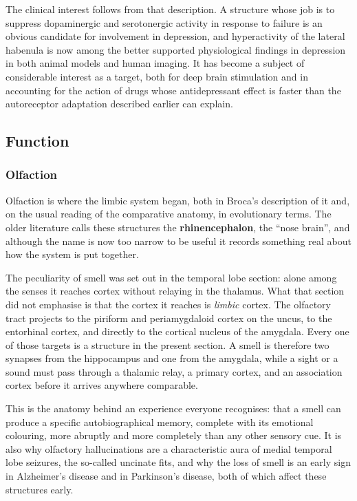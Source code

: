 \documentclass[11pt]{article}
\begin{document}
The clinical interest follows from that description. A structure whose job is to suppress dopaminergic and serotonergic activity in response to failure is an obvious candidate for involvement in depression, and hyperactivity of the lateral habenula is now among the better supported physiological findings in depression in both animal models and human imaging. It has become a subject of considerable interest as a target, both for deep brain stimulation and in accounting for the action of drugs whose antidepressant effect is faster than the autoreceptor adaptation described earlier can explain.

\subsection{Function}

\subsubsection{Olfaction}

Olfaction is where the limbic system began, both in Broca's description of it and, on the usual reading of the comparative anatomy, in evolutionary terms. The older literature calls these structures the \textbf{rhinencephalon}, the ``nose brain'', and although the name is now too narrow to be useful it records something real about how the system is put together.

The peculiarity of smell was set out in the temporal lobe section: alone among the senses it reaches cortex without relaying in the thalamus. What that section did not emphasise is that the cortex it reaches is \textit{limbic} cortex. The olfactory tract projects to the piriform and periamygdaloid cortex on the uncus, to the entorhinal cortex, and directly to the cortical nucleus of the amygdala. Every one of those targets is a structure in the present section. A smell is therefore two synapses from the hippocampus and one from the amygdala, while a sight or a sound must pass through a thalamic relay, a primary cortex, and an association cortex before it arrives anywhere comparable.

This is the anatomy behind an experience everyone recognises: that a smell can produce a specific autobiographical memory, complete with its emotional colouring, more abruptly and more completely than any other sensory cue. It is also why olfactory hallucinations are a characteristic aura of medial temporal lobe seizures, the so-called uncinate fits, and why the loss of smell is an early sign in Alzheimer's disease and in Parkinson's disease, both of which affect these structures early.
\end{document}
